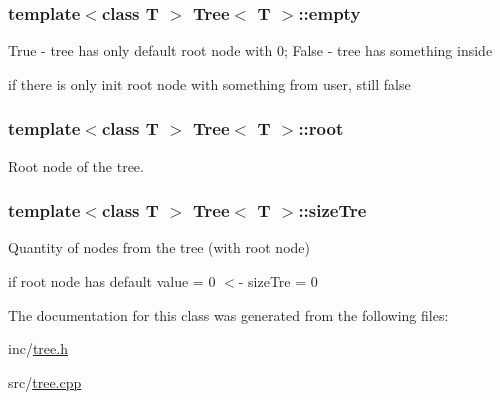 \subsubsection[{empty}]{\setlength{\rightskip}{0pt plus 5cm}template$<$class T $>$ {\bf Tree}$<$ T $>$\+::empty\hspace{0.3cm}{\ttfamily [private]}}\label{class_tree_a6a8efc96e49c135f3782ee170c588e23}
True -\/ tree has only default root node with 0; False -\/ tree has something inside

if there is only init root node with something from user, still false \hypertarget{class_tree_a5d88060c2f8354c3682d8fbe5a17ae8e}{}
\subsubsection[{root}]{\setlength{\rightskip}{0pt plus 5cm}template$<$class T $>$ {\bf Tree}$<$ T $>$\+::root\hspace{0.3cm}{\ttfamily [private]}}\label{class_tree_a5d88060c2f8354c3682d8fbe5a17ae8e}


Root node of the tree. 

\hypertarget{class_tree_ab7a8d3c9f9227a1a72cdd0e4d44b4c0a}{}
\subsubsection[{size\+Tre}]{\setlength{\rightskip}{0pt plus 5cm}template$<$class T $>$ {\bf Tree}$<$ T $>$\+::size\+Tre\hspace{0.3cm}{\ttfamily [private]}}\label{class_tree_ab7a8d3c9f9227a1a72cdd0e4d44b4c0a}


Quantity of nodes from the tree (with root node) 

if root node has default value = 0 $<$-\/ size\+Tre = 0 

The documentation for this class was generated from the following files\+:\begin{DoxyCompactItemize}
\item 
inc/\hyperlink{tree_8h}{tree.\+h}\item 
src/\hyperlink{tree_8cpp}{tree.\+cpp}\end{DoxyCompactItemize}
